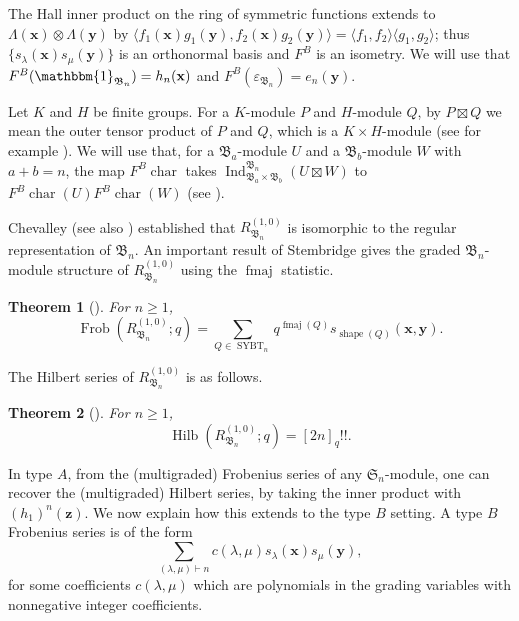 \documentclass[12pt]{amsart}
\theoremstyle{plain}
\newtheorem{theorem}{Theorem}[section]
\theoremstyle{definition}
\DeclareMathOperator{\SYBT}{SYBT}
\DeclareMathOperator{\shape}{shape}
\DeclareMathOperator{\fmaj}{fmaj}
\DeclareMathOperator{\Frob}{Frob}
\DeclareMathOperator{\Hilb}{Hilb}
\DeclareMathOperator{\Ind}{Ind}
\DeclareMathOperator{\ch}{char}
\newcommand{\x}{\mathbf{x}}
\newcommand{\y}{\mathbf{y}}
\newcommand{\z}{\mathbf{z}}
\begin{document}
The Hall inner product on the ring of symmetric functions extends to
$\Lambda(\x) \otimes \Lambda(\y)$ by $\langle f_1(\x) g_1(\y) , f_2(\x) g_2(\y) \rangle = \langle f_1,f_2 \rangle \langle g_1,g_2\rangle$; thus $\{ s_\lambda(\x) s_\mu(\y) \}$ is an orthonormal basis and $F^B$ is an isometry.
We will use that $F^B(\mathbbm{1}_{\mathfrak{B}_n}) = h_n(\x)$ and $F^B(\varepsilon_{\mathfrak{B}_n}) = e_n(\y)$.

Let $K$ and $H$ be finite groups. 
For a $K$-module $P$ and $H$-module $Q$, by $P \boxtimes Q$ we mean the outer tensor product of $P$ and $Q$, which is a $K \times H$-module (see for example \cite[Section 1.2]{MR3839282}).
We will use that, for a $\mathfrak{B}_a$-module $U$ and a $\mathfrak{B}_b$-module $W$ with $a+b=n$, the map $F^B \ch$ takes $\Ind_{\mathfrak{B}_a \times \mathfrak{B}_b}^{\mathfrak{B}_n} (U \boxtimes W)$ to $F^B\ch(U) F^B\ch(W)$ (see \cite[Chapter I, Appendix B]{Macdonald}).

Chevalley \cite{Chevalley} (see also \cite{MR59914}) established that $R_{\mathfrak{B}_n}^{(1,0)}$ is isomorphic to the regular representation of $\mathfrak{B}_n$.
An important result of Stembridge gives the graded $\mathfrak{B}_n$-module structure of $R_{\mathfrak{B}_n}^{(1,0)}$ using the $\fmaj$ statistic.
\begin{theorem}[\cite{Stembridge}]\label{thm:Stembridge}
For $n \geq 1$,
\begin{equation}\label{eq:stembridge}
\Frob(R_{\mathfrak{B}_n}^{(1,0)};q) =  \sum_{Q \in \SYBT_n} q^{\fmaj(Q)} s_{\shape(Q)}(\x,\y).
\end{equation} 
\end{theorem}

The Hilbert series of $R_{\mathfrak{B}_n}^{(1,0)}$ is as follows.
\begin{theorem}[\cite{Chevalley, MR59914}]\label{thm:Chevalley-Shephard-Todd}
For $n \geq 1$,
    \begin{equation}
\Hilb(R_{\mathfrak{B}_n}^{(1,0)};q) =  [2n]_q!!.
\end{equation} 
\end{theorem}

In type $A$, from the (multigraded) Frobenius series of any $\mathfrak{S}_n$-module, one can recover the (multigraded) Hilbert series, by taking the inner product with $(h_{1})^n(\z)$. 
We now explain how this extends to the type $B$ setting. A type $B$ Frobenius series is of the form
\begin{equation}\label{eq:general-type-B-Frob}
    \sum_{(\lambda,\mu) \vdash n} c(\lambda,\mu) s_{\lambda}(\x) s_{\mu} (\y),
\end{equation}
for some coefficients $c(\lambda,\mu)$ which are polynomials in the grading variables with nonnegative integer coefficients.
\end{document}
